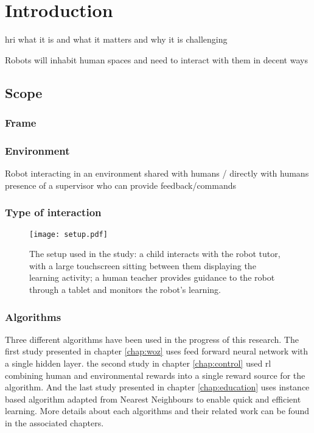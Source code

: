\chapter{Introduction} \label{chap:intro}

\gls{hri} what it is and what it matters and why it is challenging

Robots will inhabit human spaces and need to interact with them in decent ways

\section{Scope}\label{sec:intro-scope}

\subsection{Frame}

\subsection{Environment} \label{sec:scope-social}
Robot interacting in an environment shared with humans / directly with humans
presence of a supervisor who can provide feedback/commands

\subsection{Type of interaction}

\begin{figure}[ht]
	\texttt{[image: setup.pdf]}
	\centering
	\caption{The setup used in the study: a child interacts with the robot tutor, with a large touchscreen sitting between them displaying the learning activity; a human teacher provides guidance to the robot through a tablet and monitors the robot's learning.}
	\label{fig:setup}
\end{figure}

\subsection{Algorithms}

Three different algorithms have been used in the progress of this research. The first study presented in chapter \ref{chap:woz} uses feed forward neural network with a single hidden layer. the second study in chapter \ref{chap:control} used \acrlong{rl} combining human and environmental rewards into a single reward source for the algorithm. And the last study presented in chapter \ref{chap:education} uses instance based algorithm adapted from Nearest Neighbours to enable quick and efficient learning. More details about each algorithms and their related work can be found in the associated chapters.

